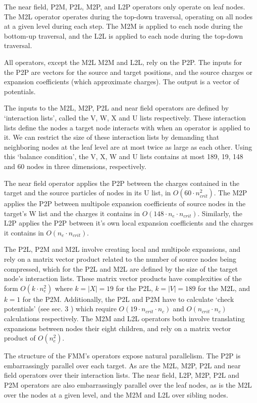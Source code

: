 \documentclass{IEEEcsmag}
\begin{document}
The near field, P2M, P2L, M2P, and L2P operators only operate on leaf nodes. The M2L operator operates during the top-down traversal, operating on all nodes at a given level during each step. The M2M is applied to each node during the bottom-up traversal, and the L2L is applied to each node during the top-down traversal. 

All operators, except the M2L M2M and L2L, rely on the P2P. The inputs for the P2P are vectors for the source and target positions, and the source charges or expansion coefficients (which approximate charges). The output is a vector of potentials. 

The inputs to the M2L, M2P, P2L and near field operators are defined by `interaction lists', called the V, W, X and U lists respectively. These interaction lists define the nodes a target node interacts with when an operator is applied to it. We can restrict the size of these interaction lists by demanding that neighboring nodes at the leaf level are at most twice as large as each other. Using this `balance condition', the V, X, W and U lists contains at most 189, 19, 148 and 60 nodes in three dimensions, respectively.

The near field operator applies the P2P between the charges contained in the target and the source particles of nodes in its U list, in $O(60 \cdot n_{crit}^2)$. The M2P applies the P2P between multipole expansion coefficients of source nodes in the target's W list and the charges it contains in $O(148 \cdot n_e \cdot n_{crit})$. Similarly, the L2P applies the P2P between it's own local expansion coefficients and the charges it contains in $O(n_e \cdot n_{crit})$.

The P2L, P2M and M2L involve creating local and multipole expansions, and rely on a matrix vector product related to the number of source nodes being compressed, which for the P2L and M2L are defined by the size of the target node's interaction lists. These matrix vector products have complexities of the form $O(k \cdot n_e^2)$ where $k = |X| = 19$ for the P2L, $k = |V| = 189$ for the M2L, and $k = 1$ for the P2M. Additionally, the P2L and P2M have to calculate `check potentials' (see sec. 3 \cite{Ying2004}) which require $O(19 \cdot n_{crit} \cdot n_c)$ and $O(n_{crit} \cdot n_c)$ calculations respectively. The M2M and L2L operators both involve translating expansions between nodes their eight children, and rely on a matrix vector product of $O(n_e^2)$.

The structure of the FMM's operators expose natural parallelism. The P2P is embarrassingly parallel over each target. As are the M2L, M2P, P2L and near field operators over their interaction lists. The near field, L2P, M2P, P2L and P2M operators are also embarrassingly parallel over the leaf nodes, as is the M2L over the nodes at a given level, and the M2M and L2L over sibling nodes.
\end{document}
